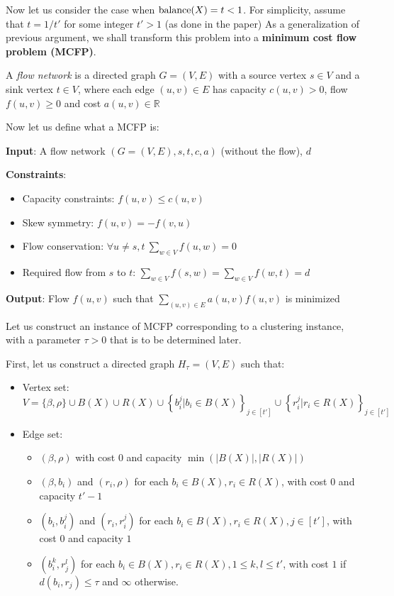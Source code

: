 Now let us consider the case when $\operatorname{balance}(X) = t < 1$. For simplicity, assume that $t = 1/t'$ for some integer $t' > 1$ (as done in the paper)
As a generalization of previous argument, we shall transform this problem into a {\bf minimum cost flow problem (MCFP)}.

\begin{definition}
A {\it flow network} is a directed graph $G = (V, E)$ with a source vertex $s \in V$ and a sink vertex $t \in V$,
where each edge $(u, v) \in E$ has capacity $c(u, v) > 0$, flow $f(u, v) \geq 0$ and cost $a(u, v) \in \mathbb{R}$

\end{definition}

Now let us define what a MCFP is:

\newpage
\begin{problem}
{\bf Input}: A flow network $(G = (V, E), s, t, c, a)$ (without the flow), $d$

{\bf Constraints}:
\begin{itemize}
	\item Capacity constraints: $f(u, v) \leq c(u, v)$
	\item Skew symmetry: $f(u, v) = -f(v, u)$
	\item Flow conservation: $\forall u \not= s, t \ \sum_{w \in V} f(u, w) = 0$
	\item Required flow from $s$ to $t$: $\sum_{w \in V} f(s, w) = \sum_{w \in V} f(w, t) = d$
\end{itemize}

{\bf Output}: Flow $f(u, v)$ such that $\sum_{(u, v) \in E} a(u, v) f(u, v)$ is minimized

\end{problem}


Let us construct an instance of MCFP corresponding to a clustering instance, with a parameter $\tau > 0$ that is to be determined later. 

First, let us construct a directed graph $H_\tau = (V, E)$ such that:

\begin{itemize}	
	\item Vertex set:
$$V = \{\beta, \rho\} \cup B(X) \cup R(X) \cup \left\{ b_i^j | b_i \in B(X) \right\}_{j \in [t']} \cup \left\{ r_i^j | r_i \in R(X) \right\}_{j \in [t']}$$

	\item Edge set:
	\begin{itemize}
		\item $(\beta, \rho)$ with cost 0 and capacity $\min \left( |B(X)|, |R(X)| \right)$
		\item $(\beta, b_i)$ and $(r_i, \rho)$ for each $b_i \in B(X), r_i \in R(X)$, with cost $0$ and capacity $t' - 1$
		\item $(b_i, b_i^j)$ and $(r_i, r_i^j)$ for each $b_i \in B(X), r_i \in R(X), j \in [t']$, with cost $0$ and capacity $1$
		\item $(b_i^k, r_j^l)$ for each $b_i \in B(X), r_i \in R(X), 1 \leq k, l \leq t'$, with cost $1$ if $d(b_i, r_j) \leq \tau$ and $\infty$ otherwise.
	\end{itemize}
	
\end{itemize}

